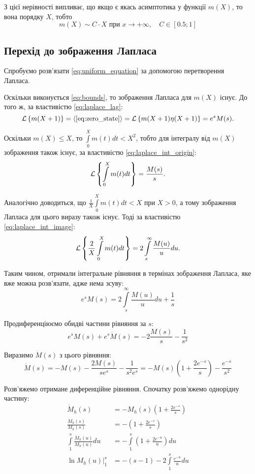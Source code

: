 З цієї нерівності випливає, що якщо є якась асимптотика у функції $m(X)$, то вона порядку $X$, тобто
\begin{equation}
	\label{eq:bounds_inference}
	m(X) \sim C\cdot X \text{ при } x \rightarrow +\infty, \quad C \in [0.5; 1]
\end{equation}

\subsection{Перехід до зображення Лапласа}
\label{sec:uniform_integral_laplace}

Спробуємо розв'язати \eqref{eq:uniform_equation} за допомогою перетворення Лапласа.

Оскільки виконується \eqref{eq:bounds}, то зображення Лапласа для $m(X)$ існує. До того ж, за властивістю \eqref{eq:laplace_lag}:
$$\mathcal{L}\left\{m(X+1)\right\}=\langle\eqref{eq:zero_state}\rangle=\mathcal{L}\left\{m(X+1)\eta(X+1)\right\}=e^s M(s).$$

Оскільки $m(X) \leq X$, то $\int\limits_0^X m(t) dt < X^2$, тобто для інтегралу від $m(X)$ зображення також існує, за властивістю \eqref{eq:laplace_int_origin}:
$$\mathcal{L}\left\{\int\limits_0^X m(t) dt\right\} = \frac{M(s)}{s}.$$

Аналогічно доводиться, що $\frac{1}{X}\int\limits_0^X m(t) dt < X$ при $X>0$, а тому зображення Лапласа для цього виразу також існує. Тоді за властивістю \eqref{eq:laplace_int_image}:
$$\mathcal{L}\left\{\frac{2}{X}\int\limits_0^X m(t) dt\right\} = 2 \int\limits_s^\infty \frac{M(u)}{u} du.$$

Таким чином, отримали інтегральне рівняння в термінах зображення Лапласа, яке вже можна розв'язати, адже нема зсуву:
\begin{equation}
	\label{eq:uniform_laplace_integral}
	e^s M(s) = 2 \int\limits_s^\infty \frac{M(u)}{u} du + \frac{1}{s}
\end{equation}

Продиференціюємо обидві частини рівняння за $s$:
\begin{equation}
	e^s M(s) + e^s \dot M(s) = - 2\frac{M(s)}{s}  - \frac1{s^2}
\end{equation}

Виразимо $\dot M(s)$ з цього рівняння:
\begin{equation}
	\label{eq:uniform_laplace_diff}
	\dot M(s) = -M(s) - \frac{2M(s)}{se^s} - \frac{1}{s^2 e^s} = - M(s)\left(1 + \frac{2e^{-s}}{s}\right) - \frac{e^{-s}}{s^2}
\end{equation}

Розв'яжемо отримане диференційне рівняння. Спочатку розв'яжемо однорідну частину:
\begin{align*}
	\dot M_h (s) &= - M_h (s)\left(1 + \frac{2e^{-s}}{s}\right) \\
	\frac{\dot M_h (s)}{M_h (s)} &= -\left(1 + \frac{2e^{-s}}{s}\right) \\
	\int\limits_1^s \frac{\dot M_h (u)}{M_h (u)} du &= -\int\limits_1^s \left(1 + \frac{2e^{-u}}{u}\right) du \\
	\left. \ln{M_h (u)}\right|_1^s &= - (s - 1) - 2 \int\limits_1^s \frac{e^{-u}}{u} du
\end{align*}

